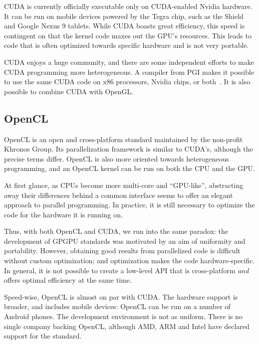 \documentclass[english,12pt]{ifimaster}
\begin{document}

CUDA is currently officially executable only on CUDA-enabled Nvidia
hardware. It can be run on mobile devices powered by the Tegra chip,
such as the Shield and Google Nexus 9 tablets. While CUDA boasts great
efficiency, this speed is contingent on that the kernel code maxes out
the GPU's resources. This leads to code that is often optimized
towards specific hardware and is not very portable.

CUDA enjoys a huge community, and there are some independent efforts
to make CUDA programming more heterogeneous. A compiler from PGI makes
it possible to use the same CUDA code on x86 processors, Nvidia chips,
or both~\citep{pgi2010:-cuda}. It is also possible to combine CUDA
with OpenGL.

\subsection{OpenCL}

OpenCL is an open and cross-platform standard maintained by the
non-profit Khronos Group. Its parallelization framework is similar to
CUDA's, although the precise terms differ. OpenCL is also more
oriented towards heterogeneous programming, and an OpenCL kernel can
be run on both the CPU and the GPU.


At first glance, as CPUs become more multi-core and ``GPU-like'',
abstracting away their differences behind a common interface seems to
offer an elegant approach to parallel programming. In practice, it is
still necessary to optimize the code for the hardware it is running
on.


Thus, with both OpenCL and CUDA, we run into the same paradox: the
development of GPGPU standards was motivated by an aim of uniformity
and portability. However, obtaining good results from parallelized
code is difficult without custom optimization; and optimization makes
the code hardware-specific. In general, it is not possible to create a
low-level API that is cross-platform \emph{and} offers optimal
efficiency at the same time.

Speed-wise, OpenCL is almost on par with CUDA. The hardware support is
broader, and includes mobile devices: OpenCL can be run on a number of
Android phones. The development environment is not as uniform. There
is no single company backing OpenCL, although AMD, ARM and Intel have
declared support for the standard.
\end{document}

